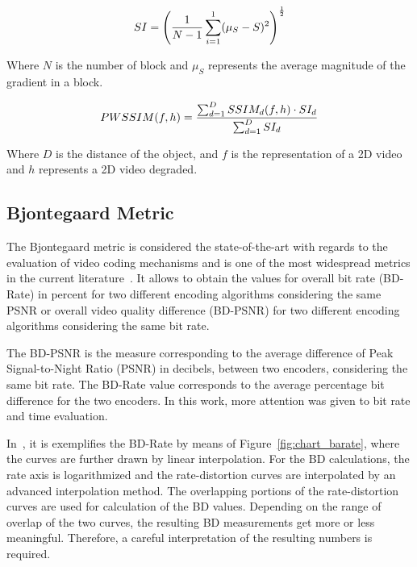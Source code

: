 \documentclass[journal]{IEEEtran}
\begin{document}

\begin{equation}
	\centering
	\label{si}
	SI = \left ( \frac{1}{N-1}\sum_{i=1}^{1}(\mu_{S}-S)^{2} \right )^{\frac{1}{2}}
\end{equation}

Where $N$ is the number of block and $\mu_{S}$ represents the average magnitude of the gradient in a block.

\begin{equation}
	\centering
	\label{pwssim}
	PWSSIM(f,h)= \frac{\sum_{d=1}^{D}SSIM_{d}(f,h)\cdot SI_{d}}{\sum_{d=1}^{D}SI_{d}}		
\end{equation}

Where $D$ is the distance of the object, and $f$ is the representation of a 2D video and $h$ represents a 2D video degraded.


\subsection{Bjontegaard Metric}

The Bjontegaard metric is considered the state-of-the-art with regards to the evaluation of video coding mechanisms and is one of the most widespread metrics in the current literature~\cite{Bjontegaard:01}\cite{Mathias}. It allows to obtain the values for overall bit rate (BD-Rate) in percent for two different encoding algorithms
considering the same PSNR or overall video quality difference (BD-PSNR) for two different encoding algorithms considering the same bit rate. %
	
The BD-PSNR is the measure corresponding to the average difference of Peak Signal-to-Night Ratio (PSNR) in decibels, between two encoders, considering the same bit rate. The BD-Rate value corresponds to the average percentage bit difference for the two encoders. In this work, more attention was given to bit rate and time evaluation.	


In~\cite{Mathias}, it is exemplifies the BD-Rate by means of Figure~\ref{fig:chart_barate}, where the curves are further drawn by linear interpolation. For the BD calculations, the rate axis is logarithmized and the rate-distortion curves are interpolated by an advanced interpolation method. The overlapping portions of the rate-distortion curves are used for calculation of the BD values. Depending on the range of overlap of the two curves, the resulting BD measurements get more or less meaningful. Therefore, a careful interpretation of the resulting numbers is required.
\end{document}
